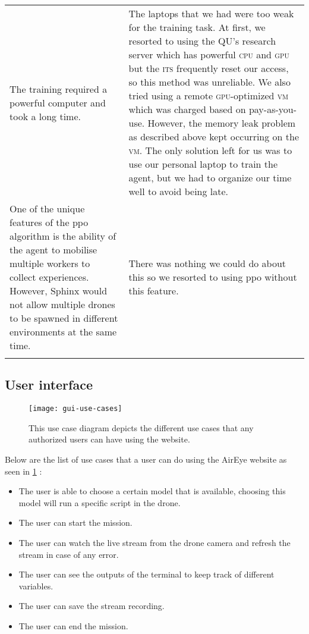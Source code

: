 \documentclass[../main.tex]{subfiles}
\begin{document}
\begin{center}
\begin{xltabular}{\textwidth}{ X X }
        The training required a powerful computer and took a long
        time.
            & 
        The laptops that we had were too weak for the training task. 
        At first, we resorted to using the QU's research server which
        has powerful \textsc{cpu} and \textsc{gpu} but the \textsc{its}
        frequently reset our access, so this method was unreliable.
        We also tried using a remote \textsc{gpu}-optimized
        \textsc{vm} which was charged based on pay-as-you-use.
        However, the memory leak problem as described above kept
        occurring on the \textsc{vm}.
        The only solution left for us was to use our personal laptop
        to train the agent, but we had to organize our time well to
        avoid being late.
            \\ \addlinespace

        One of the unique features of the \gls{ppo} algorithm is the
        ability of the agent to mobilise multiple workers to collect
        experiences. 
        However, Sphinx would not allow multiple drones to be spawned
        in different environments at the same time.
            & 
        There was nothing we could do about this so we resorted to
        using \gls{ppo} without this feature.
            \\ \addlinespace

        \bottomrule		
    \end{xltabular}
\end{center}

\subsection{User interface}

\begin{figure}[tbp] 
	\centering
	\texttt{[image: gui-use-cases]} 
	\caption{This use case diagram depicts the different use cases that any authorized users can have using the website.}
	\label{fig:gui-use-cases} 
\end{figure}

Below are the list of use cases that a user can do using the AirEye website as seen in \cref{fig:gui-use-cases} : 
\begin{itemize}	
	\item The user is able to choose a certain model that is available, choosing this model will run a specific script in the drone. 
	\item The user can start the mission.
	\item The user can watch the live stream from the drone camera and refresh the stream in case of any error.
	\item The user can see the outputs of the terminal to keep track of different variables.
	\item The user can save the stream recording. 
	\item The user can end the mission.
\end{itemize}
\end{document}
